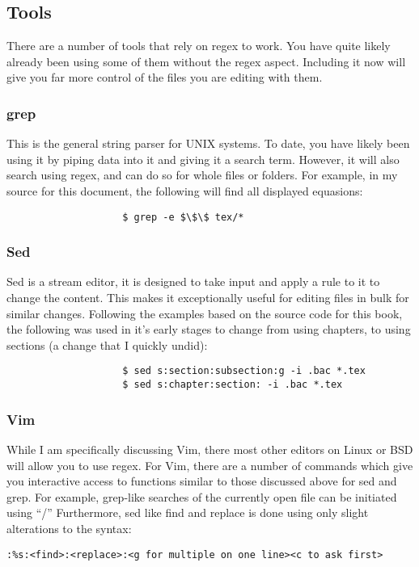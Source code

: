 		\subsection{Tools}
			There are a number of tools that rely on regex to work.
			You have quite likely already been using some of them without the regex aspect.
			Including it now will give you far more control of the files you are editing with them.

			\subsubsection{grep}
				This is the general string parser for UNIX systems.
				To date, you have likely been using it by piping data into it and giving it a search term.
				However, it will also search using regex, and can do so for whole files or folders.
				For example, in my source for this document, the following will find all displayed equasions:
				\begin{verbatim}
					$ grep -e $\$\$ tex/*
				\end{verbatim}
			\subsubsection{Sed}
				Sed is a stream editor, it is designed to take input and apply a rule to it to change the content.
				This makes it exceptionally useful for editing files in bulk for similar changes.
				Following the examples based on the source code for this book, the following was used in it's early stages to change from using chapters, to using sections (a change that I quickly undid):
				\begin{verbatim}
					$ sed s:section:subsection:g -i .bac *.tex
					$ sed s:chapter:section: -i .bac *.tex
				\end{verbatim}
			\subsubsection{Vim}
				While I am specifically discussing Vim, there most other editors on Linux or BSD will allow you to use regex.
				For Vim, there are a number of commands which give you interactive access to functions similar to those discussed above for sed and grep.
				For example, grep-like searches of the currently open file can be initiated using ``/''
				Furthermore, sed like find and replace is done using only slight alterations to the syntax:
				\begin{verbatim}
:%s:<find>:<replace>:<g for multiple on one line><c to ask first>
				\end{verbatim}

